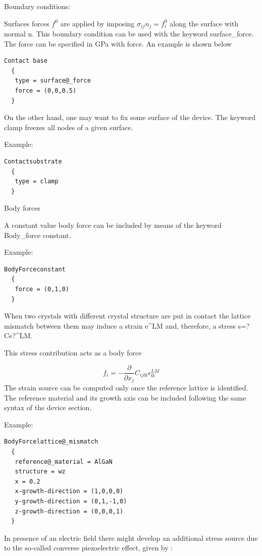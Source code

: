 \documentclass[letterpaper,10pt,english]{sphinxmanual}
\begin{document}
Boundary conditions:


Surfaces forces $f^0$ are applied by imposing $\sigma_{ij} n_{j} = f_i^0$ along the surface with normal n.
This boundary condition can be used with the keyword surface\_force. The force can be specified in GPa with force.
An example is shown below


\begin{Verbatim}[commandchars=@\[\]]
Contact base
  {
   type = surface@_force
   force = (0,0,0.5)
  }
\end{Verbatim}

On the other hand, one may want to fix some surface of the device. The keyword clamp freezes all nodes of a given surface.


Example:


\begin{Verbatim}[commandchars=@\[\]]
Contactsubstrate
  {
   type = clamp
  }
\end{Verbatim}

Body forces


A constant value body force can be included by means of the keyword Body\_force constant.


Example:


\begin{Verbatim}[commandchars=@\[\]]
BodyForceconstant
  {
   force = (0,1,0)
  }
\end{Verbatim}

When two crystals with different crystal structure are put in contact the lattice mismatch between them may induce a strain e\textasciicircum{}LM and, therefore, a stress s=?Ce?\textasciicircum{}LM.


This stress contribution acts as a body force

 \[
 f_i = -\frac{\partial }{\partial x_j} C_{ijlk}\epsilon_{lk}^{LM}
 \]
The strain source can be computed only once the reference lattice is identified.
The reference material and its growth axis can be included following the same syntax of the device section.


Example:


\begin{Verbatim}[commandchars=@\[\]]
BodyForcelattice@_mismatch
  {
   reference@_material = AlGaN
   structure = wz
   x = 0.2
   x-growth-direction = (1,0,0,0)
   y-growth-direction = (0,1,-1,0)
   z-growth-direction = (0,0,0,1)
  }
\end{Verbatim}

In presence of an electric field there might develop an additional stress source due to the so-called converse piezoelectric effect, given by :
\end{document}
